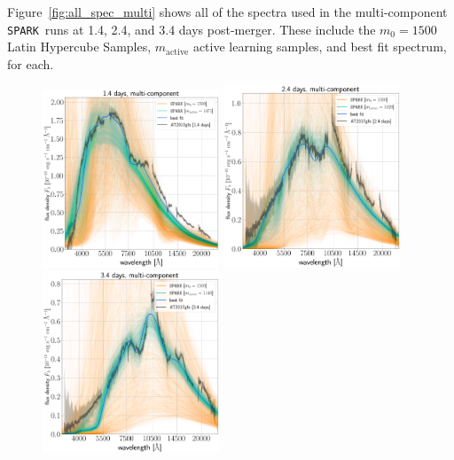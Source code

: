 \documentclass[twocolumn, twocolappendix]{aastex63}
\def\SPARK{\texttt{SPARK}}
\begin{document}
Figure~\ref{fig:all_spec_multi} shows all of the spectra used in the multi-component \SPARK~runs at 1.4, 2.4, and 3.4 days post-merger. These include the $m_0 = 1500$ Latin Hypercube Samples, $m_{\mathrm{active}}$ active learning samples, and best fit spectrum, for each.

\begin{figure}[!ht]
    \centering
    \includegraphics[width=0.47\textwidth]{figs/appendix/all-spec/230412_040127_single_all_TARDIS_evals_mactive-1471_m0-1500.png}
    \includegraphics[width=0.47\textwidth]{figs/appendix/all-spec/230412_035244_single_all_TARDIS_evals_mactive-1020_m0-1500.png}
    \includegraphics[width=0.47\textwidth]{figs/appendix/all-spec/230626_073230_single_all_TARDIS_evals_mactive-1140_m0-1500.png}

\end{figure}
\end{document}
